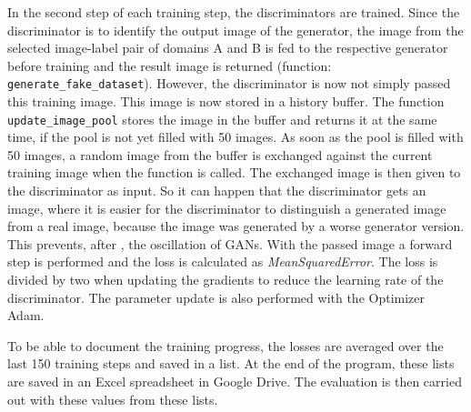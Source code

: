 \documentclass[fleqn,10pt]{SelfArx} %
\begin{document}
In the second step of each training step, the discriminators are trained. Since the discriminator is to identify the output image of the generator, the image from the selected image-label pair of domains A and B is fed to the respective generator before training and the result image is returned (function: \texttt{generate\_fake\_dataset}). However, the discriminator is now not simply passed this training image. This image is now stored in a history buffer. The function \texttt{update\_image\_pool} stores the image in the buffer and returns it at the same time, if the pool is not yet filled with 50 images. As soon as the pool is filled with 50 images, a random image from the buffer is exchanged against the current training image when the function is called. The exchanged image is then given to the discriminator as input. So it can happen that the discriminator gets an image, where it is easier for the discriminator to distinguish a generated image from a real image, because the image was generated by a worse generator version. This prevents, after \cite{oscillation}, the oscillation of \ac{GAN}s. With the passed image a forward step is performed and the loss is calculated as \textit{MeanSquaredError}. The loss is divided by two when updating the gradients to reduce the learning rate of the discriminator. The parameter update is also performed with the Optimizer Adam.~\cite{image-to-image-ccan, google-Adam, google-GradientTape}

To be able to document the training progress, the losses are averaged over the last 150 training steps and saved in a list. At the end of the program, these lists are saved in an Excel spreadsheet in Google Drive. The evaluation is then carried out with these values from these lists.
\end{document}

